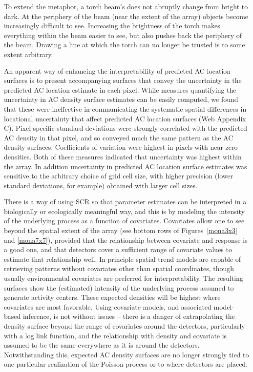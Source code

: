 \documentclass[useAMS,usenatbib,referee]{biom}
\begin{document}
To extend the metaphor, a torch beam's does not abruptly change from bright to dark. At the periphery of the beam (near the extent of the array) objects become increasingly difficult to see. Increasing the brightness of the torch makes everything within the beam easier to see, but also pushes back the periphery of the beam. Drawing a line at which the torch can no longer be trusted is to some extent arbitrary. 

An apparent way of enhancing the interpretability of predicted AC location surfaces is to present accompanying surfaces that convey the uncertainty in the predicted AC location estimate in each pixel. While measures quantifying the uncertainty in AC density surface estimates can be easily computed, we found that these were ineffective in communicating the systematic spatial differences in locational uncertainty that affect predicted AC location surfaces (Web Appendix C). Pixel-specific standard deviations were strongly correlated with the predicted AC density in that pixel, and so conveyed much the same pattern as the AC density surfaces. Coefficients of variation were highest in pixels with near-zero densities. Both of these measures indicated that uncertainty was highest within the array. In addition uncertainty in predicted AC location surface estimates was sensitive to the arbitrary choice of grid cell size, with higher precision (lower standard deviations, for example) obtained with larger cell sizes. 

There is a way of using SCR so that parameter estimates can be interpreted in a biologically or ecologically meaningful way, and this is by modeling the intensity of the underlying process as a function of covariates. Covariates allow one to see beyond the spatial extent of the array (see bottom rows of Figures~\ref{mona3x3} and \ref{mona7x7}), provided that the relationship between covariate and response is a good one, and that detectors cover a sufficient range of covariate values to estimate that relationship well. In principle spatial trend models are capable of retrieving patterns without covariates other than spatial coordinates, though usually environmental covariates are preferred for interpretability. The resulting surfaces show the (estimated) intensity of the underlying process assumed to generate activity centers. These expected densities will be highest where covariates are most favorable. Using covariate models, and associated model-based inference, is not without issues -- there is a danger of extrapolating the density surface beyond the range of covariates around the detectors, particularly with a log link function, and the relationship with density and covariate is assumed to be the same everywhere as it is around the detectors. Notwithstanding this, expected AC density surfaces are no longer strongly tied to one particular realization of the Poisson process or to where detectors are placed.
\end{document}
